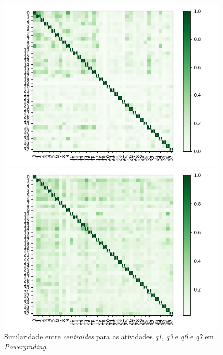 \begin{figure}[!h]
\begin{minipage}[t]{.45\textwidth}
\includegraphics[width=\textwidth]{figuras/Powergrading/hm-q6.png} 
\end{minipage}%
\begin{minipage}[t]{.45\textwidth}
\centering
\includegraphics[width=\textwidth]{figuras/Powergrading/hm-q7.png} 
\end{minipage}
\caption{Similaridade entre \textit{centroides} para as atividades \textit{q1}, \textit{q3} e \textit{q6} e \textit{q7} em \textit{Powergrading}.}
\label{fig-hmPowergrading}
\end{figure}

